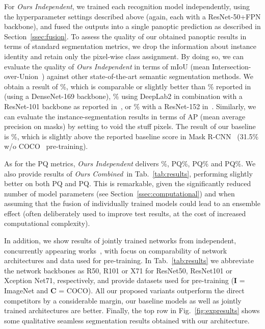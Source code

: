 \documentclass[10pt,twocolumn,letterpaper]{article}
\newcommand{\indep}{\emph{Ours Independent}\xspace}
\newcommand{\joint}{\emph{Ours Combined}\xspace}
\begin{document}
For \indep, we trained each recognition model independently, using the hyperparameter settings described above (again, each with a ResNet-50+FPN backbone), and fused the outputs into a single panoptic prediction as described in Section~\ref{ssec:fusion}. To assess the quality of our obtained panoptic results in terms of standard segmentation metrics, we drop the information about instance identity and retain only the pixel-wise class assignment. By doing so, we can evaluate the quality of \indep in terms of mIoU (mean Intersection-over-Union~\cite{Everingham2010}) against other state-of-the-art semantic segmentation methods. We obtain a result of \%, which is comparable or slightly better than \% reported in~\cite{Kreso_2017_ICCV} (using a DenseNet-169 backbone), \% using DeepLab2 in combination with a ResNet-101 backbone as reported in~\cite{RotNeuKon17cvpr}, or \% with a ResNet-152 in~\cite{Wu2016}. Similarly, we can evaluate the instance-segmentation results in terms of AP (mean average precision on masks)  by setting to void the stuff pixels. The result of our baseline is \%, which is slightly above the reported baseline score in Mask R-CNN~\cite{He2017} (31.5\% w/o COCO~\cite{LinMSCOCO2014} pre-training).

As for the PQ metrics, \indep delivers \%, PQ\%, PQ\% and PQ\%. We also provide results of \joint~in Tab.~\ref{tab:results}, performing slightly better on both PQ and PQ. This is remarkable, given the significantly reduced number of model parameters (see Section~\ref{ssec:computational}) and when assuming that the fusion of individually trained models could lead to an ensemble effect (often deliberately used to improve test results, at the cost of increased computational complexity).

In addition, we show results of jointly trained networks from independent, concurrently appearing works~\cite{Geus18,Li2018,Xiong_UBER_2019,Kirillov19,Yang_Google_2019}, with focus on comparability of network architectures and data used for pre-training. In Tab.~\ref{tab:results} we abbreviate the network backbones as R50, R101 or X71 for ResNet50, ResNet101 or Xception Net71, respectively, and provide datasets used for pre-training (\textbf{I} = ImageNet and \textbf{C} = COCO). All our proposed variants outperform the direct competitors by a considerable margin, \ie our baseline models as well as jointly trained architectures are better.
Finally, the top row in Fig.~\ref{fig:expresults} shows some qualitative seamless segmentation results obtained with our architecture.
\end{document}
